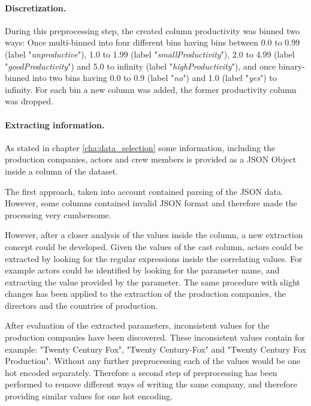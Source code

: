 \paragraph{Discretization.}
During this preprocessing step, the created column productivity was binned two ways: Once multi-binned into four different bins having bins between 0.0 to 0.99 (label "\textit{unproductive}"), 1.0 to 1.99 (label "\textit{smallProductivity}"), 2.0 to 4.99 (label "\textit{goodProductivity}") and 5.0 to infinity (label "\textit{highProductivity}"), and once binary-binned into two bins having 0.0 to 0.9 (label "\textit{no}") and 1.0 (label "\textit{yes}") to infinity. For each bin a new column was added, the former productivity column was dropped.

\paragraph{Extracting information.}
As stated in chapter \ref{cha:data_selection} some information, including the production companies, actors and crew members is provided as a JSON Object inside a column of the dataset. 

The first approach, taken into account contained parsing of the JSON data. However, some columns contained invalid JSON format and therefore made the processing very cumbersome.

However, after a closer analysis of the values inside the column, a new extraction concept could be developed. Given the values of the cast column, actors could be extracted by looking for the regular expressions inside the correlating values. For example actors could be identified by looking for the parameter name, and extracting the value provided by the parameter. The same procedure with slight changes has been applied to the extraction of the production companies, the directors and the countries of production.

After evaluation of the extracted parameters, inconsistent values for the production companies have been discovered. These inconsistent values contain for example: "Twenty Century Fox", "Twenty Century-Fox" and "Twenty Century Fox Production". Without any further preprocessing each of the values would be one hot encoded separately. Therefore a second step of preprocessing has been performed to remove different ways of writing the same company, and therefore providing similar values for one hot encoding.
 
